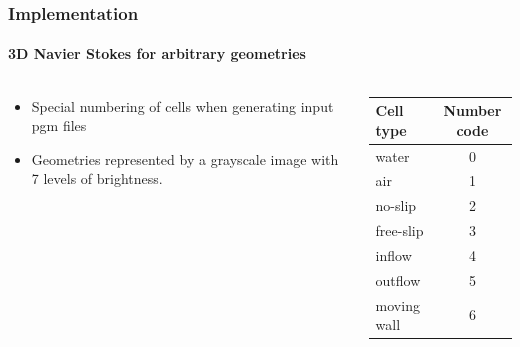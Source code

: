 \documentclass{beamer}
\begin{document}
\begin{frame}
\frametitle{Implementation}
\framesubtitle{3D Navier Stokes for arbitrary geometries}
\begin{columns}
\begin{column}{0.48\textwidth}
\begin{itemize}
\item Special numbering of cells when generating input pgm files
\item Geometries represented by a grayscale image with 7 levels of brightness.
\end{itemize} 
\end{column}
\begin{column}{0.48\textwidth}
\begin{table}[ht!]
\flushleft
\label{tab1}
\begin{tabular}{|l|c|}
\hline
{\bf Cell type} & {\bf Number code}\\
\hline
water & 0 \\
air & 1 \\
no-slip & 2 \\
free-slip & 3 \\
inflow & 4 \\
outflow & 5 \\
moving wall & 6 \\
\hline
\end{tabular}
\end{table}
\end{column}
\end{columns}
\end{frame}
\end{document}
